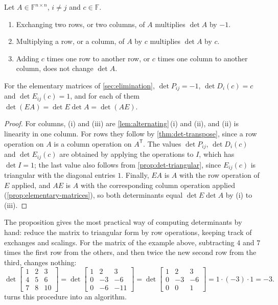 \begin{proposition}
\label{prop:det-elementary}
Let $A\in\mathbb F^{n\times n}$, $i\ne j$ and $c\in\mathbb F$.
\begin{enumerate}
\item Exchanging two rows, or two columns, of $A$ multiplies $\det A$ by $-1$.
\item Multiplying a row, or a column, of $A$ by $c$ multiplies $\det A$ by $c$.
\item Adding $c$ times one row to another row, or $c$ times one column to another column, does not change $\det A$.
\end{enumerate}
For the elementary matrices of \cref{sec:elimination}, $\det P_{ij}=-1$, $\det D_i(c)=c$ and $\det E_{ij}(c)=1$, and for each of them $\det(EA)=\det E\det A=\det(AE)$.
\end{proposition}

\begin{proof}
For columns, (i) and (iii) are \cref{lem:alternating}\,(i) and (ii), and (ii) is linearity in one column. For rows they follow by \cref{thm:det-transpose}, since a row operation on $A$ is a column operation on $A^{\mathsf T}$. The values $\det P_{ij}$, $\det D_i(c)$ and $\det E_{ij}(c)$ are obtained by applying the operations to $I$, which has $\det I=1$; the last value also follows from \cref{prop:det-triangular}, since $E_{ij}(c)$ is triangular with the diagonal entries $1$. Finally, $EA$ is $A$ with the row operation of $E$ applied, and $AE$ is $A$ with the corresponding column operation applied (\cref{prop:elementary-matrices}), so both determinants equal $\det E\det A$ by (i) to (iii).
\end{proof}

The proposition gives the most practical way of computing determinants by hand: reduce the matrix to triangular form by row operations, keeping track of exchanges and scalings. For the matrix of the example above, subtracting $4$ and $7$ times the first row from the others, and then twice the new second row from the third, changes nothing:
\[
\det\begin{bmatrix}1&2&3\\4&5&6\\7&8&10\end{bmatrix}=\det\begin{bmatrix}1&2&3\\0&-3&-6\\0&-6&-11\end{bmatrix}=\det\begin{bmatrix}1&2&3\\0&-3&-6\\0&0&1\end{bmatrix}=1\cdot(-3)\cdot1=-3 .
\]
 turns this procedure into an algorithm.

